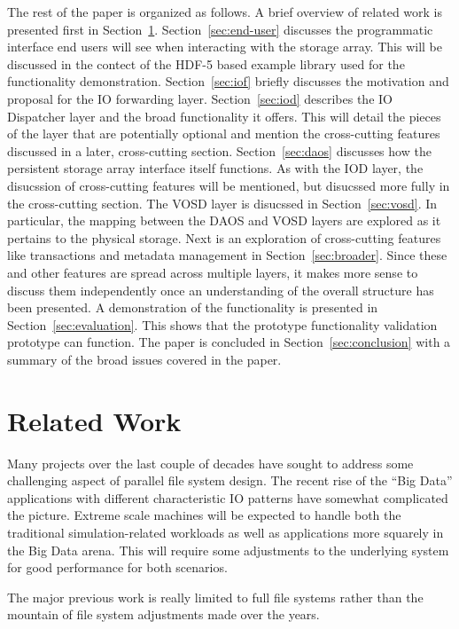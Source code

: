 \documentclass[conference]{IEEEtran}
\begin{document}
The rest of the paper is organized as follows. A brief overview of related work
is presented first in Section~\ref{sec:related}. Section~\ref{sec:end-user}
discusses the programmatic interface end users will see when interacting with
the storage array. This will be discussed in the contect of the HDF-5 based
example library used for the functionality demonstration. Section~\ref{sec:iof}
briefly discusses the motivation and proposal for the IO forwarding layer.
Section~\ref{sec:iod} describes the IO Dispatcher layer and the broad
functionality it offers. This will detail the pieces of the layer that are
potentially optional and mention the cross-cutting features discussed in a
later, cross-cutting section. Section~\ref{sec:daos} discusses how the
persistent storage array interface itself functions. As with the IOD layer, the
disucssion of cross-cutting features will be mentioned, but disucssed more
fully in the cross-cutting section. The VOSD layer is disucssed in
Section~\ref{sec:vosd}. In particular, the mapping between the DAOS and VOSD
layers are explored as it pertains to the physical storage. Next is an
exploration of cross-cutting features like transactions and metadata management
in Section~\ref{sec:broader}. Since these and other features are spread across
multiple layers, it makes more sense to discuss them independently once an
understanding of the overall structure has been presented.  A demonstration
of the functionality is presented in Section~\ref{sec:evaluation}. This shows
that the prototype functionality validation prototype can function. The paper
is concluded in Section~\ref{sec:conclusion} with a summary of the broad issues
covered in the paper.

\section{Related Work}
\label{sec:related}

Many projects over the last couple of decades have sought to address some
challenging aspect of parallel file system design. The recent rise of the ``Big
Data'' applications with different characteristic IO patterns have somewhat
complicated the picture. Extreme scale machines will be expected to handle both
the traditional simulation-related workloads as well as applications more
squarely in the Big Data arena. This will require some adjustments to the
underlying system for good performance for both scenarios.

The major previous work is really limited to full file systems rather than the
mountain of file system adjustments made over the years.
\end{document}
